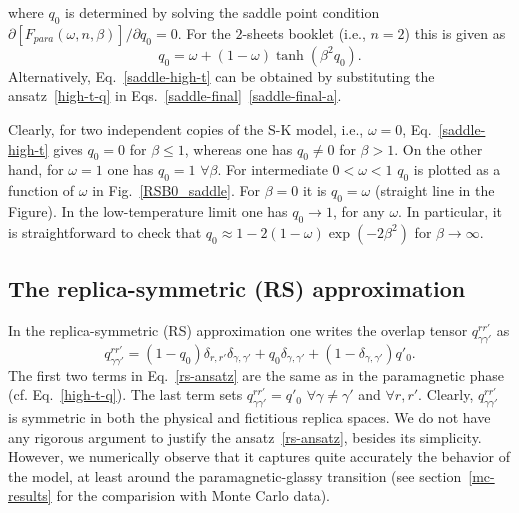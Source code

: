 \documentclass[twocolumn,superscriptaddress,prb,10pt]{revtex4-1}
\begin{document}
%
where $q_0$ is determined by solving the saddle point condition $\partial[F_{para}
(\omega,n,\beta)]/\partial q_0=0$. For the $2$-sheets booklet (i.e., $n=2$) this is  
given as   
%
\begin{equation}
q_0=\omega+(1-\omega)\tanh(\beta^2 q_0).
\label{saddle-high-t}
\end{equation}
%
Alternatively, Eq.~\eqref{saddle-high-t} can be obtained by substituting the 
ansatz~\eqref{high-t-q} in Eqs.~\eqref{saddle-final}~\eqref{saddle-final-a}. 

Clearly, for two independent copies of the S-K model, i.e., $\omega=0$,  
Eq.~\eqref{saddle-high-t} gives $q_0=0$ for $\beta\le1$, whereas 
one has $q_0\ne0$ for $\beta>1$. On the other hand, for $\omega=1$ 
one has $q_0=1$ $\forall\beta$. For intermediate $0<\omega<1$ $q_0$ 
is plotted as a function of $\omega$ in Fig.~\ref{RSB0_saddle}. For $\beta=0$ it 
is $q_0=\omega$ (straight line in the Figure). In the low-temperature limit 
one has $q_0\to 1$, for any $\omega$. In particular, it is straightforward 
to check that  $q_0\approx 1-2(1-\omega)\exp(-2\beta^2)$ for $\beta\to\infty$. 


\subsection{The replica-symmetric (RS) approximation} 
\label{rs-section}

In the replica-symmetric (RS) approximation one writes the overlap tensor  
$q_{\gamma\gamma'}^{rr'}$ as
%
\begin{equation}
q_{\gamma\gamma'}^{rr'}=(1-q_0)\delta_{r,r'}\delta_{\gamma,\gamma'}+
q_0\delta_{\gamma,\gamma'}+(1-\delta_{\gamma,\gamma'})q'_0.
\label{rs-ansatz}
\end{equation}
%
The first two terms in Eq.~\eqref{rs-ansatz} are the same as in the paramagnetic 
phase (cf. Eq.~\eqref{high-t-q}). The last term sets $q_{\gamma\gamma'}^{rr'}=q'_0$ 
$\forall\gamma\ne\gamma'$ and $\forall r,r'$. Clearly, $q_{\gamma\gamma'}^{rr'}$ is 
symmetric in both the physical and fictitious replica spaces. We do not have any 
rigorous argument to justify the ansatz~\eqref{rs-ansatz}, besides its simplicity. 
However, we numerically observe that it captures quite accurately the behavior of 
the model, at least around the paramagnetic-glassy transition (see section~\ref{mc-results} 
for the comparision with Monte Carlo data). 
\end{document}
